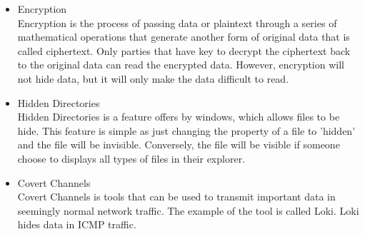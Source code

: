 \documentclass[conference, compsoc]{IEEEtran}
\begin{document}
\begin{itemize}
\item Encryption\\
      Encryption is the process of passing data or plaintext 			  through a series of mathematical operations that generate 		  another form of original data that is called ciphertext. 			  Only parties that have key to decrypt the ciphertext back 		  to the original data can read the encrypted data. However, 		  encryption will not hide data, but it will only make the 			  data difficult to read.\\
\item Hidden Directories\\ 
      Hidden Directories is a feature offers by windows, which 			  allows files to be hide. This feature is simple as just 			  changing the property of a file to 'hidden' and the file 			  will be invisible. Conversely, the file will be visible if 		  someone choose to displays all types of files in their 			  explorer.\\
\item Covert Channels\\
      Covert Channels is tools that can be used to transmit 			  important data in seemingly normal network traffic. The 			  example of the tool is called Loki. Loki hides data in ICMP 	  traffic.\\            
\end{itemize}
\\
%
%
\end{document}
